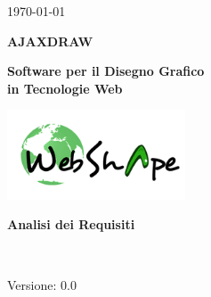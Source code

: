 \usepackage{multirow}


\renewcommand{\insertversion}{0.0} %
\renewcommand{\TITOLODOC}{Analisi dei Requisiti} %

\begin{titlepage}
\begin{center}
	\begin{Large}	\today \end{Large}
\end{center}

\vspace{20pt}

\begin{center}
	\begin{Huge}
				\textbf{AJAXDRAW}
	\end{Huge}
\end{center}			

\begin{center}
	\begin{large}
				\textbf{Software per il Disegno Grafico\\ in Tecnologie Web}
	\end{large}
\end{center}			

\vspace{20pt}

\begin{center}
\includegraphics[width=150pt]{../logo/logo}
\end{center}

\vspace{160pt}
\begin{center} %
	\begin{Huge}
				\textbf{\TITOLODOC}
	\end{Huge}
			\\
\end{center}
\vspace{220pt}
\begin{center}
Versione: \insertversion
\end{center}
\end{titlepage}

